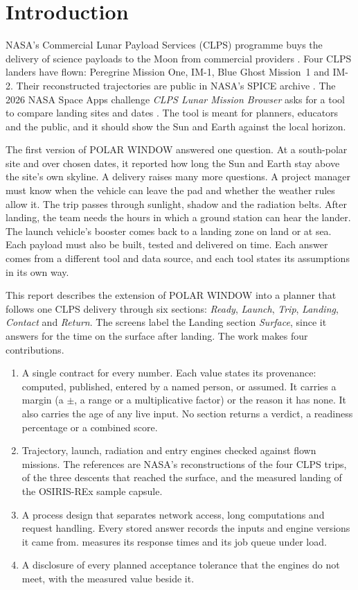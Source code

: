 \documentclass[11pt,a4paper]{article}
\begin{document}
\section{Introduction}
\label{sec:intro}

NASA's Commercial Lunar Payload Services (CLPS) programme buys the delivery of science
payloads to the Moon from commercial providers \citep{nasaclps}. Four CLPS landers have
flown: Peregrine Mission One, IM-1, Blue Ghost Mission~1 and IM-2. Their reconstructed
trajectories are public in NASA's SPICE archive \citep{naifclps}. The 2026 NASA Space Apps challenge \emph{CLPS Lunar Mission Browser} asks for a tool to compare landing sites and dates \citep{spaceapps2026}. The tool is meant for planners, educators and the public, and it should show the Sun and Earth against the local horizon.

The first version of POLAR WINDOW answered one question. At a south-polar site and over
chosen dates, it reported how long the Sun and Earth stay above the site's own skyline.
A delivery raises many more questions. A project manager must know when the vehicle can
leave the pad and whether the weather rules allow it. The trip passes through sunlight,
shadow and the radiation belts. After landing, the team needs the hours in which a
ground station can hear the lander. The launch vehicle's booster comes back to a landing zone on
land or at sea. Each payload must also be built, tested and delivered on
time. Each answer comes from a different tool and data source, and each tool states its
assumptions in its own way.

This report describes the extension of POLAR WINDOW into a planner that follows one CLPS
delivery through six sections: \emph{Ready}, \emph{Launch}, \emph{Trip}, \emph{Landing},
\emph{Contact} and \emph{Return}. The screens label the Landing section \emph{Surface}, since it
answers for the time on the surface after landing. The work makes four contributions.
\begin{enumerate}
\item A single contract for every number. Each value states its provenance: computed, published, entered by a named person, or assumed. It carries a margin (a $\pm$, a range or a multiplicative factor) or the reason it has none. It also carries the age of any live input. No
  section returns a verdict, a readiness percentage or a combined score.
\item Trajectory, launch, radiation and entry engines checked against flown missions.
  The references are NASA's reconstructions of the four CLPS trips, of the three descents
  that reached the surface, and the measured landing of the OSIRIS-REx sample capsule.
\item A process design that separates network access, long computations and request
  handling. Every stored answer records the inputs and engine versions it came from.
   measures its response times and its job queue under load.
\item A disclosure of every planned acceptance tolerance that the engines do not meet,
  with the measured value beside it.
\end{enumerate}
\end{document}
